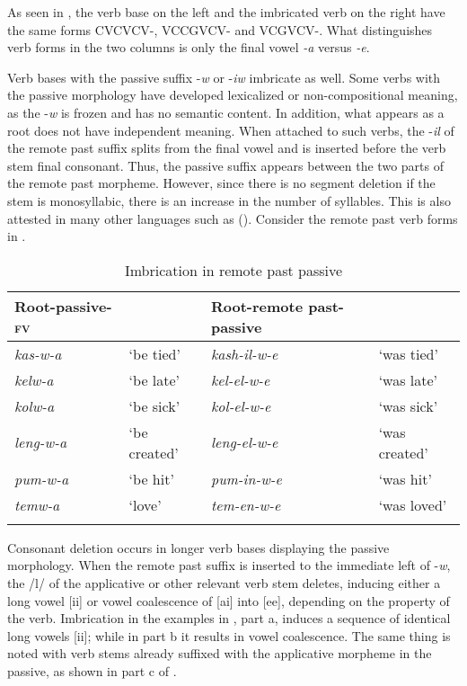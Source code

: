 \documentclass[output=paper]{langsci/langscibook}
\begin{document}
As seen in , the verb base on the left and the imbricated verb on the right have the same forms CVCVCV-, VCCGVCV- and VCGVCV-. What distinguishes verb forms in the two columns is only the final vowel \textit{-a} versus \textit{-e}.

 
Verb bases with the passive suffix -\textit{w} or -\textit{iw }imbricate as well. Some verbs with the passive morphology have developed lexicalized or non-compositional meaning, as the -\textit{w} is frozen and has no semantic content. In addition, what appears as a root does not have independent meaning. When attached to such verbs, the -\textit{il} of the remote past suffix splits from the final vowel and is inserted before the verb stem final consonant. Thus, the passive suffix appears between the two parts of the remote past morpheme. However, since there is no segment deletion if the stem is monosyllabic, there is an increase in the number of syllables. This is also attested in many other  languages such as  (\citealt{chebanne1993,hyman1995,kula2002}). Consider the remote past verb forms in .
 

\begin{table}
\begin{tabularx}{\textwidth}{lXlX}
\lsptoprule
Root-passive-\textsc{fv} &  & Root-remote past-passive & \\
\midrule 
\textit{kas-w-a} & `be tied' & \textit{kash-il-w-e} & `was tied' \\
\textit{kelw-a} & `be late' & \textit{kel-el-w-e} & `was late' \\
\textit{kolw-a} & `be sick' & \textit{kol-el-w-e} & `was sick' \\
\textit{leng-w-a} & `be created' & \textit{leng-el-w-e} & `was created' \\
\textit{pum-w-a} & `be hit' & \textit{pum-in-w-e} & `was hit' \\
\textit{temw-a} & `love' & \textit{tem-en-w-e} & `was loved' \\

\lspbottomrule
\end{tabularx}

\caption{Imbrication in remote past passive}
\label{tab:25.kawasha}

\end{table}

Consonant deletion occurs in longer verb bases displaying the passive morphology. When the remote past suffix is inserted to the immediate left of -\textit{w}, the /l/ of the applicative or other relevant verb stem deletes, inducing either a long vowel [ii] or vowel coalescence of [ai] into [ee], depending on the property of the verb. Imbrication in the examples in , part a, induces a sequence of identical long vowels [ii]; while in part b it results in vowel coalescence. The same thing is noted with verb stems already suffixed with the applicative morpheme in the passive, as shown in part c of .
\end{document}
